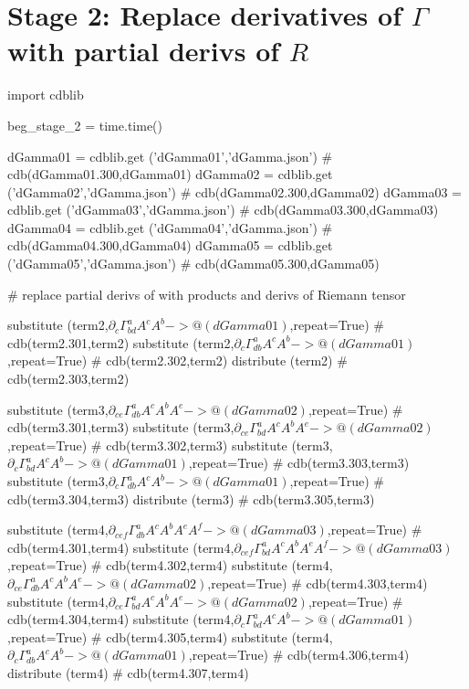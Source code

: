 \documentclass[12pt]{cdblatex}
\begin{document}
\clearpage

\section*{Stage 2: Replace derivatives of $\Gamma$ with partial derivs of $R$}

\begin{cadabra}
   import cdblib

   beg_stage_2 = time.time()

   dGamma01 = cdblib.get ('dGamma01','dGamma.json')  # cdb(dGamma01.300,dGamma01)
   dGamma02 = cdblib.get ('dGamma02','dGamma.json')  # cdb(dGamma02.300,dGamma02)
   dGamma03 = cdblib.get ('dGamma03','dGamma.json')  # cdb(dGamma03.300,dGamma03)
   dGamma04 = cdblib.get ('dGamma04','dGamma.json')  # cdb(dGamma04.300,dGamma04)
   dGamma05 = cdblib.get ('dGamma05','dGamma.json')  # cdb(dGamma05.300,dGamma05)

   # replace partial derivs of \Gamma with products and derivs of Riemann tensor

   substitute (term2,$\partial_{c}{\Gamma^{a}_{b d}}A^{c}A^{b} -> @(dGamma01)$,repeat=True)                       # cdb(term2.301,term2)
   substitute (term2,$\partial_{c}{\Gamma^{a}_{d b}}A^{c}A^{b} -> @(dGamma01)$,repeat=True)                       # cdb(term2.302,term2)
   distribute (term2)                                                                                             # cdb(term2.303,term2)

   substitute (term3,$\partial_{c e}{\Gamma^{a}_{d b}}A^{c}A^{b}A^{e} -> @(dGamma02)$,repeat=True)                # cdb(term3.301,term3)
   substitute (term3,$\partial_{c e}{\Gamma^{a}_{b d}}A^{c}A^{b}A^{e} -> @(dGamma02)$,repeat=True)                # cdb(term3.302,term3)
   substitute (term3,$\partial_{c}{\Gamma^{a}_{b d}}A^{c}A^{b} -> @(dGamma01)$,repeat=True)                       # cdb(term3.303,term3)
   substitute (term3,$\partial_{c}{\Gamma^{a}_{d b}}A^{c}A^{b} -> @(dGamma01)$,repeat=True)                       # cdb(term3.304,term3)
   distribute (term3)                                                                                             # cdb(term3.305,term3)

   substitute (term4,$\partial_{c e f}{\Gamma^{a}_{d b}}A^{c}A^{b}A^{e}A^{f} -> @(dGamma03)$,repeat=True)         # cdb(term4.301,term4)
   substitute (term4,$\partial_{c e f}{\Gamma^{a}_{b d}}A^{c}A^{b}A^{e}A^{f} -> @(dGamma03)$,repeat=True)         # cdb(term4.302,term4)
   substitute (term4,$\partial_{c e}{\Gamma^{a}_{d b}}A^{c}A^{b}A^{e} -> @(dGamma02)$,repeat=True)                # cdb(term4.303,term4)
   substitute (term4,$\partial_{c e}{\Gamma^{a}_{b d}}A^{c}A^{b}A^{e} -> @(dGamma02)$,repeat=True)                # cdb(term4.304,term4)
   substitute (term4,$\partial_{c}{\Gamma^{a}_{b d}}A^{c}A^{b} -> @(dGamma01)$,repeat=True)                       # cdb(term4.305,term4)
   substitute (term4,$\partial_{c}{\Gamma^{a}_{d b}}A^{c}A^{b} -> @(dGamma01)$,repeat=True)                       # cdb(term4.306,term4)
   distribute (term4)                                                                                             # cdb(term4.307,term4)


\end{cadabra}
\end{document}
